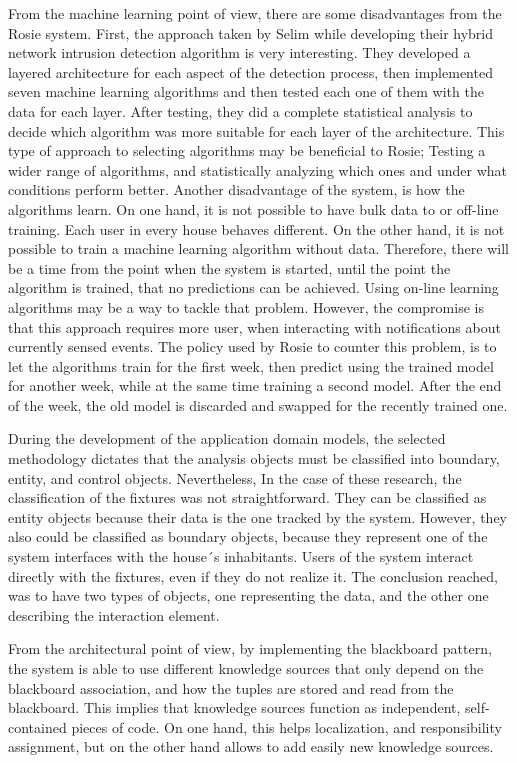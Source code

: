 From the machine learning point of view, there are some disadvantages from the Rosie system. First, the approach taken by Selim \etAl \cite{hybridMultilevelIntrusion} while developing their hybrid network intrusion detection algorithm is very interesting. They developed a layered architecture for each aspect of the detection process, then implemented seven machine learning algorithms and then tested each one of them with the data for each layer. After testing, they did a complete statistical analysis to decide which algorithm was more suitable for each layer of the architecture. This type of approach to selecting algorithms may be beneficial to Rosie; Testing a wider range of algorithms, and statistically analyzing which ones and under what conditions perform better. 
Another disadvantage of the system, is how the algorithms learn. On one hand, it is not possible to have bulk data to or off-line training. Each user in every house behaves different. On the other hand, it is not possible to train a machine learning algorithm without data. Therefore, there will be a time from the point when the system is started, until the point the algorithm is trained, that no predictions can be achieved. Using on-line learning algorithms may be a way to tackle that problem. However, the compromise is that this approach requires more user, when interacting with notifications about currently sensed events. The policy used by Rosie to counter this problem, is to let the algorithms train for the first week, then predict using the trained model for another week, while at the same time training a second model. After the end of the week, the old model is discarded and swapped for the recently trained one.

During the development of the application domain models, the selected methodology dictates that the analysis objects must be classified into boundary, entity, and control objects. Nevertheless, In the case of these research, the classification of the fixtures was not straightforward. They can be classified as entity objects because their data is the one tracked by the system. However, they also could be classified as boundary objects, because they represent one of the system interfaces with the house´s inhabitants. Users of the system interact directly with the fixtures, even if they do not realize it. The conclusion reached, was to have two types of objects, one representing the data, and the other one describing the interaction element. 

From the architectural point of view, by implementing the blackboard pattern, the system is able to use different knowledge sources that only depend on the blackboard association, and how the tuples are stored and read from the blackboard. This implies that knowledge sources function as independent, self-contained pieces of code. On one hand, this helps localization, and responsibility assignment, but on the other hand allows to add easily new knowledge sources.

